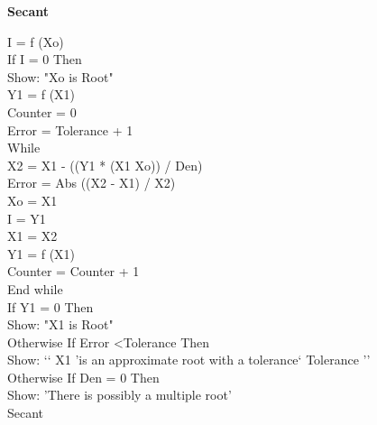 \documentclass[letterpaper,12pt]{article}
\begin{document}
\textbf{Secant}
\IncMargin{1em}
\begin{algorithm}
\BlankLine
I = f (Xo)\\
If I = 0 Then\\
Show: "Xo is Root"\\
Y1 = f (X1)\\
Counter = 0\\
Error = Tolerance + 1\\

While\\

X2 = X1 - ((Y1 * (X1 Xo)) / Den)\\
Error = Abs ((X2 - X1) / X2)\\
Xo = X1\\
I = Y1\\
X1 = X2\\
Y1 = f (X1)\\
Counter = Counter + 1\\

End while\\
If Y1 = 0 Then\\
Show: "X1 is Root"\\
Otherwise If Error <Tolerance Then\\
Show: ‘‘ X1 ’is an approximate root with a tolerance‘ Tolerance ’’\\
Otherwise If Den = 0 Then\\
Show: 'There is possibly a multiple root'\\
\caption{Secant}
\end{algorithm}\DecMargin{1em}
\end{document}

